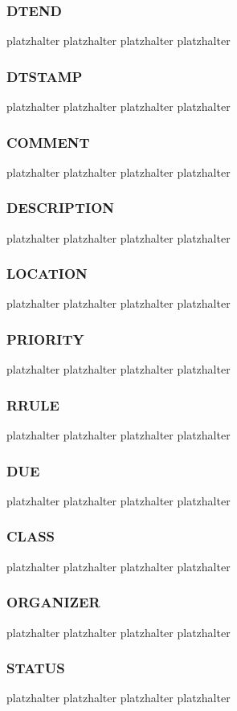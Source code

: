 \subsubsection{DTEND}
\label{sec:dtend}
platzhalter platzhalter platzhalter platzhalter 
\subsubsection{DTSTAMP}
\label{sec:dtstamp}
platzhalter platzhalter platzhalter platzhalter 
\subsubsection{COMMENT}
\label{sec:comment}
platzhalter platzhalter platzhalter platzhalter 
\subsubsection{DESCRIPTION}
\label{sec:description}
platzhalter platzhalter platzhalter platzhalter 
\subsubsection{LOCATION}
\label{sec:location}
platzhalter platzhalter platzhalter platzhalter 
\subsubsection{PRIORITY}
\label{sec:priority}
platzhalter platzhalter platzhalter platzhalter 
\subsubsection{RRULE}
\label{sec:rrule}
platzhalter platzhalter platzhalter platzhalter 
\subsubsection{DUE}
\label{sec:due}
platzhalter platzhalter platzhalter platzhalter 
\subsubsection{CLASS}
\label{sec:class}
platzhalter platzhalter platzhalter platzhalter 
\subsubsection{ORGANIZER}
\label{sec:organizer}
platzhalter platzhalter platzhalter platzhalter 
\subsubsection{STATUS}
\label{sec:status}
platzhalter platzhalter platzhalter platzhalter 
